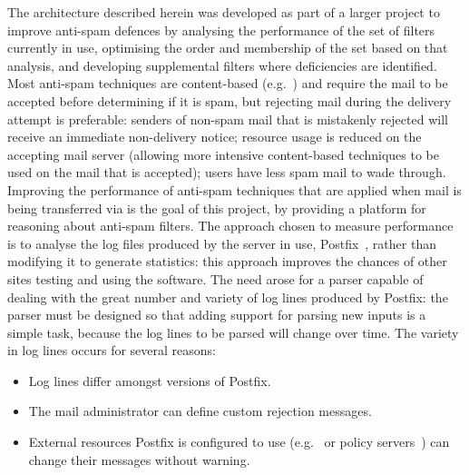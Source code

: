 \documentclass[preprint,draft,numbers,1p]{elsarticle}
\begin{document}
The architecture described herein was developed as part of a larger project
to improve anti-spam defences by analysing the performance of the set of
filters currently in use, optimising the order and membership of the set
based on that analysis, and developing supplemental filters where
deficiencies are identified.  Most anti-spam techniques are content-based
(e.g.~\cite{a-plan-for-spam,word-stemming,relaxed-online-svms}) and
require the mail to be accepted before determining if it is spam, but
rejecting mail during the delivery attempt is preferable: senders of
non-spam mail that is mistakenly rejected will receive an immediate
non-delivery notice; resource usage is reduced on the accepting mail server
(allowing more intensive content-based techniques to be used on the mail
that is accepted); users have less spam mail to wade through.  Improving
the performance of anti-spam techniques that are applied when mail is being
transferred via \SMTP{}\footnotemark{} is the goal of this project, by
providing a platform for reasoning about anti-spam filters.  The approach
chosen to measure performance is to analyse the log files produced by the
\SMTP{} server in use, Postfix~\cite{postfix}, rather than modifying it to
generate statistics: this approach improves the chances of other sites
testing and using the software.  The need arose for a parser capable of
dealing with the great number and variety of log lines produced by Postfix:
the parser must be designed so that adding support for parsing new inputs
is a simple task, because the log lines to be parsed will change over time.
The variety in log lines occurs for several reasons:

\begin{itemize}

    \item Log lines differ amongst versions of Postfix.
        
    \item The mail administrator can define custom rejection messages.

    \item External resources Postfix is configured to use (e.g.\ \DNSBL{}
        or policy servers~\cite{policy-servers}) can change their messages
        without warning.

\end{itemize}
\end{document}
